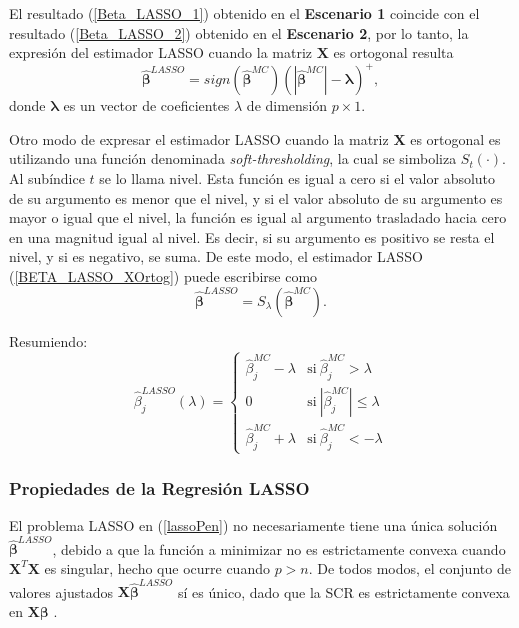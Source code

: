 \documentclass[a4paper,12pt]{report}
\begin{document}
El resultado (\ref{Beta_LASSO_1}) obtenido en el \textbf{Escenario 1} coincide con el resultado (\ref{Beta_LASSO_2}) obtenido en el \textbf{Escenario 2}, por lo tanto, la expresión del estimador LASSO cuando la matriz $\boldsymbol{X}$ es ortogonal resulta
\begin{equation}
\label{BETA_LASSO_XOrtog}
\boldsymbol{\hat{\beta}}^{LASSO}=sign(\boldsymbol{\hat{\beta}}^{MC})(|\boldsymbol{\hat{\beta}}^{MC}|-\boldsymbol{\lambda})^+,
\end{equation}
donde $\boldsymbol{\lambda}$ es un vector de coeficientes $\lambda$ de dimensión $p \times 1$.

Otro modo de expresar el estimador LASSO cuando la matriz $\boldsymbol{X}$ es ortogonal es utilizando una función denominada \textit{soft-thresholding}, la cual se simboliza $S_t(\cdot)$. Al subíndice $t$ se lo llama nivel. Esta función es igual a cero si el valor absoluto de su argumento es menor que el nivel, y si el valor absoluto de su argumento es mayor o igual que el nivel, la función es igual al argumento trasladado hacia cero en una magnitud igual al nivel. Es decir, si su argumento es positivo se resta el nivel, y si es negativo, se suma. De este modo, el estimador LASSO (\ref{BETA_LASSO_XOrtog}) puede escribirse como
\begin{equation}
\boldsymbol{\hat{\beta}}^{LASSO}=S_\lambda\left( \boldsymbol{\hat{\beta}}^{MC} \right).
\end{equation}

Resumiendo:
\begin{equation}
    \hat{\beta}_{j}^{LASSO}(\lambda)=
    \begin{cases}
      \hat{\beta}_j^{MC} - \lambda & \text{si}\ \hat{\beta}_j^{MC} > \lambda \\
      0 & \text{si}\ |\hat{\beta}_j^{MC}| \leq \lambda \\
      \hat{\beta}_j^{MC} + \lambda & \text{si}\ \hat{\beta}_j^{MC} < - \lambda
    \end{cases}
\end{equation}


\subsubsection{Propiedades de la Regresión LASSO}
El problema LASSO en (\ref{lassoPen}) no necesariamente tiene una única solución $\boldsymbol{\hat{\beta}}^{LASSO}$, debido a que la función a minimizar no es estrictamente convexa cuando $\boldsymbol{X}^T\boldsymbol{X}$ es singular, hecho que ocurre cuando $p > n$. De todos modos, el conjunto de valores ajustados $\boldsymbol{X}\boldsymbol{\hat{\beta}}^{LASSO}$ sí es único, dado que la SCR es estrictamente convexa en $\boldsymbol{X}\boldsymbol{\beta}$ \citep{tibshirani2013lasso}.
\end{document}
